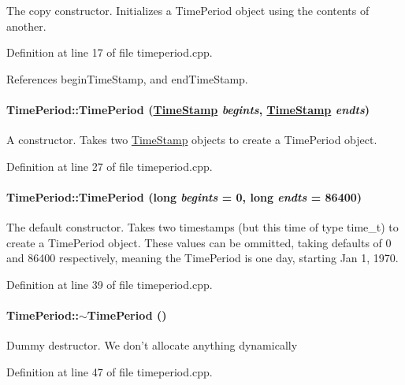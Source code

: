 The copy constructor. Initializes a Time\-Period object using the contents of another. 

Definition at line 17 of file timeperiod.cpp.

References begin\-Time\-Stamp, and end\-Time\-Stamp.\hypertarget{classTimePeriod_TimePerioda1}{
\paragraph[TimePeriod]{\setlength{\rightskip}{0pt plus 5cm}Time\-Period::Time\-Period (\hyperlink{classTimeStamp}{Time\-Stamp} {\em begints}, \hyperlink{classTimeStamp}{Time\-Stamp} {\em endts})}\hfill}
\label{classTimePeriod_TimePerioda1}


A constructor. Takes two \hyperlink{classTimeStamp}{Time\-Stamp} objects to create a Time\-Period object. 

Definition at line 27 of file timeperiod.cpp.\hypertarget{classTimePeriod_TimePerioda2}{
\paragraph[TimePeriod]{\setlength{\rightskip}{0pt plus 5cm}Time\-Period::Time\-Period (long {\em begints} = 0, long {\em endts} = 86400)}\hfill}
\label{classTimePeriod_TimePerioda2}


The default constructor. Takes two timestamps (but this time of type time\_\-t) to create a Time\-Period object. These values can be ommitted, taking defaults of 0 and 86400 respectively, meaning the Time\-Period is one day, starting Jan 1, 1970. 

Definition at line 39 of file timeperiod.cpp.\hypertarget{classTimePeriod_TimePerioda3}{
\paragraph[$\sim$TimePeriod]{\setlength{\rightskip}{0pt plus 5cm}Time\-Period::$\sim$Time\-Period ()}\hfill}
\label{classTimePeriod_TimePerioda3}


Dummy destructor. We don't allocate anything dynamically 

Definition at line 47 of file timeperiod.cpp.

